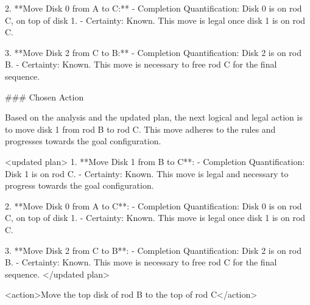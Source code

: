 \documentclass[11pt]{article}
\begin{document}
\begin{HighlightVerbatim}
2. **Move Disk 0 from A to C:**
   - Completion Quantification: Disk 0 is on rod C, on top of disk 1.
   - Certainty: Known. This move is legal once disk 1 is on rod C.

3. **Move Disk 2 from C to B:**
   - Completion Quantification: Disk 2 is on rod B.
   - Certainty: Known. This move is necessary to free rod C for the final sequence.

### Chosen Action

Based on the analysis and the updated plan, the next logical and legal action is to move disk 1 from rod B to rod C. This move adheres to the rules and progresses towards the goal configuration.

<updated plan>
1. **Move Disk 1 from B to C**:
   - Completion Quantification: Disk 1 is on rod C.
   - Certainty: Known. This move is legal and necessary to progress towards the goal configuration.

2. **Move Disk 0 from A to C**:
   - Completion Quantification: Disk 0 is on rod C, on top of disk 1.
   - Certainty: Known. This move is legal once disk 1 is on rod C.

3. **Move Disk 2 from C to B**:
   - Completion Quantification: Disk 2 is on rod B.
   - Certainty: Known. This move is necessary to free rod C for the final sequence.
</updated plan>

<action>Move the top disk of rod B to the top of rod C</action>
\end{HighlightVerbatim}
\end{document}
